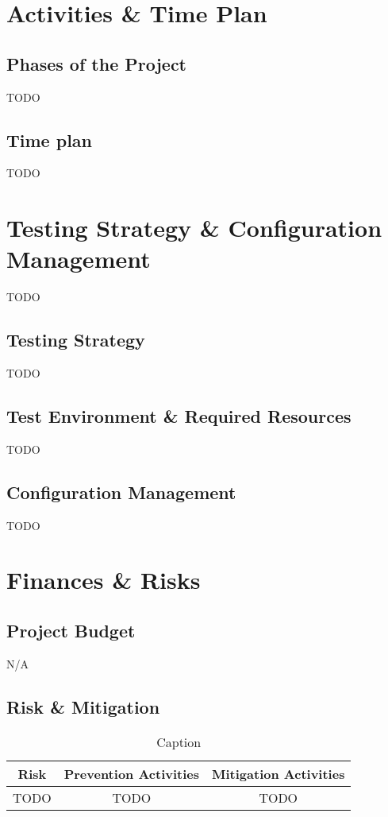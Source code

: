 \documentclass{article}
\begin{document}
\newpage
\section{Activities \& Time Plan}
    \subsection{Phases of the Project}
    TODO
    \subsection{Time plan}
    TODO

\newpage
\section{Testing Strategy \& Configuration Management}
    TODO
    \subsection{Testing Strategy}
    TODO
    \subsection{Test Environment \& Required Resources}
    TODO
    \subsection{Configuration Management}
    TODO

\newpage
\section{Finances \& Risks}
    \subsection{Project Budget}
    N/A

    \subsection{Risk \& Mitigation}
    \begin{table}[h!]
        \centering
        \begin{tabular}{|c|c|c|}
             \hline \textbf{Risk} & \textbf{Prevention Activities} & \textbf{Mitigation Activities} \\
             \hline TODO & TODO & TODO \\
             \hline
        \end{tabular}
        \caption{Caption}
        \label{tab:my_label}
    \end{table}
\end{document}
